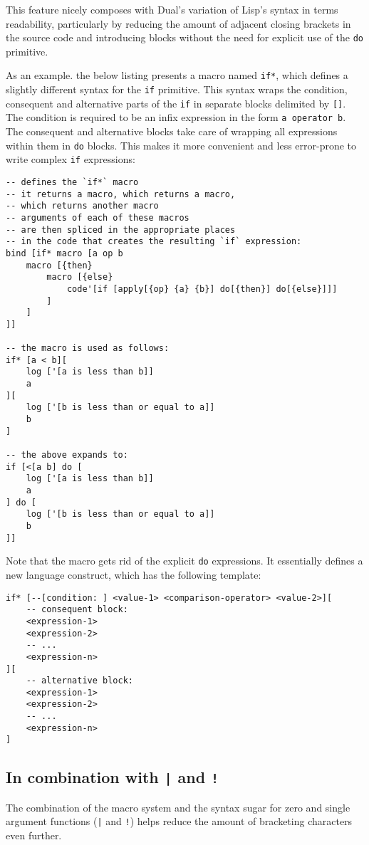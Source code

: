 This feature nicely composes with Dual's variation of Lisp's syntax in terms readability, particularly by reducing the amount of adjacent closing brackets in the source code and introducing blocks without the need for explicit use of the \texttt{do} primitive.

As an example. the below listing presents a macro named \texttt{if*}, which defines a slightly different syntax for the \texttt{if} primitive. This syntax wraps the condition, consequent and alternative parts of the \texttt{if} in separate blocks delimited by \texttt{[]}. The condition is required to be an infix expression in the form \texttt{a operator b}. The consequent and alternative blocks take care of wrapping all expressions within them in \texttt{do} blocks. This makes it more convenient and less error-prone to write complex \texttt{if} expressions:
\begin{lstlisting}
-- defines the `if*` macro
-- it returns a macro, which returns a macro,
-- which returns another macro
-- arguments of each of these macros
-- are then spliced in the appropriate places
-- in the code that creates the resulting `if` expression:
bind [if* macro [a op b
    macro [{then}
        macro [{else}
            code'[if [apply[{op} {a} {b}] do[{then}] do[{else}]]]
        ]
    ]
]]

-- the macro is used as follows: 
if* [a < b][
    log ['[a is less than b]]
    a
][
    log ['[b is less than or equal to a]]
    b
]

-- the above expands to:
if [<[a b] do [
    log ['[a is less than b]]
    a
] do [
    log ['[b is less than or equal to a]]
    b
]]
\end{lstlisting}

Note that the macro gets rid of the explicit \texttt{do} expressions. It essentially defines a new language construct, which has the following template:
\begin{lstlisting}
if* [--[condition: ] <value-1> <comparison-operator> <value-2>][
    -- consequent block:
    <expression-1>
    <expression-2>
    -- ...
    <expression-n>
][
    -- alternative block:
    <expression-1>
    <expression-2>
    -- ...
    <expression-n>
]
\end{lstlisting}

\subsection{In combination with \texttt{|} and \texttt{!}}\label{subsub:macros}
The combination of the macro system and the syntax sugar for zero and single argument functions (\texttt{|} and \texttt{!}) helps reduce the amount of bracketing characters even further.

